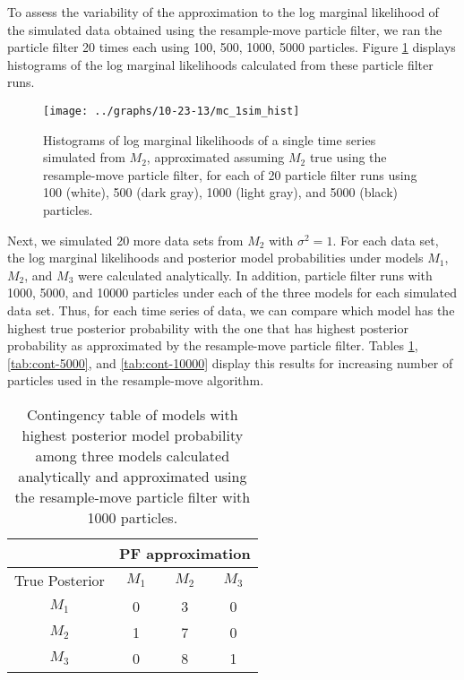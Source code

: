 \documentclass{article}
\begin{document}
To assess the variability of the approximation to the log marginal likelihood of the simulated data obtained using the resample-move particle filter, we ran the particle filter 20 times each using 100, 500, 1000, 5000 particles. Figure \ref{fig:pf-hist} displays histograms of the log marginal likelihoods calculated from these particle filter runs.

\begin{figure}
\texttt{[image: ../graphs/10-23-13/mc\_1sim\_hist]}
\caption{Histograms of log marginal likelihoods of a single time series simulated from $M_2$, approximated assuming $M_2$ true using the resample-move particle filter, for each of 20 particle filter runs using 100 (white), 500 (dark gray), 1000 (light gray), and 5000 (black) particles.} \label{fig:pf-hist}
\end{figure}

Next, we simulated 20 more data sets from $M_2$ with $\sigma^2 = 1$. For each data set, the log marginal likelihoods and posterior model probabilities under models $M_1$, $M_2$, and $M_3$ were calculated analytically. In addition, particle filter runs with 1000, 5000, and 10000 particles under each of the three models for each simulated data set. Thus, for each time series of data, we can compare which model has the highest true posterior probability with the one that has highest posterior probability as approximated by the resample-move particle filter. Tables \ref{tab:cont-1000}, \ref{tab:cont-5000}, and \ref{tab:cont-10000} display this results for increasing number of particles used in the resample-move algorithm.

\begin{table}[h]
\centering
\caption{Contingency table of models with highest posterior model probability among three models calculated analytically and approximated using the resample-move particle filter with 1000 particles.} \label{tab:cont-1000}
\begin{tabular}{|c|c|c|c|}
  \hline
 & \multicolumn{3}{|c|}{PF approximation} \\
 \hline
 True Posterior & $M_1$& $M_2$ & $M_3$ \\
  \hline
$M_1$ &   0 &   3 &   0 \\
\hline
$M_2$ &   1 &   7 &   0 \\
\hline
$M_3$ &   0 &   8 &   1 \\
   \hline
\end{tabular}
\end{table}
\end{document}
